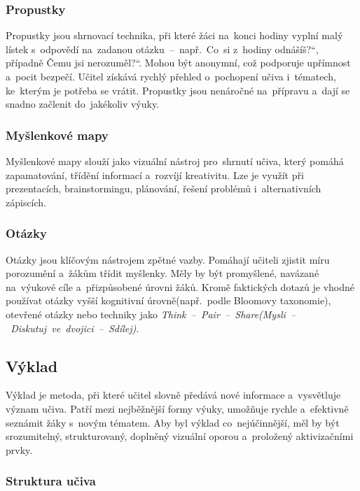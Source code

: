 \documentclass[male,czech,api_bc]{kitheses}
\begin{document}
\subsubsection{Propustky}

Propustky jsou shrnovací technika, při které žáci na~konci hodiny vyplní malý lístek s~odpovědí na~zadanou otázku~--~např.~\quotedblbase Co~si z~hodiny odnášíš?“, případně \quotedblbase Čemu jsi nerozuměl?“. Mohou být anonymní, což podporuje upřímnost a~pocit bezpečí. Učitel získává rychlý přehled o~pochopení učiva i~tématech, ke~kterým je potřeba se vrátit. Propustky jsou nenáročné na~přípravu a~dají se snadno začlenit do~jakékoliv výuky.\cite{eduPropustky}

\subsubsection{Myšlenkové mapy}

Myšlenkové mapy slouží jako vizuální nástroj pro~shrnutí učiva, který pomáhá zapamatování, třídění informací a~rozvíjí kreativitu. Lze je využít při prezentacích, brainstormingu, plánování, řešení problémů i~alternativních zápiscích.\cite{eduMyslenkoveMapy}

\subsubsection{Otázky}

Otázky jsou klíčovým nástrojem zpětné vazby. Pomáhají učiteli zjistit míru porozumění a~žákům třídit myšlenky. Měly by být promyšlené, navázané na~výukové cíle a~přizpůsobené úrovni žáků. Kromě faktických dotazů je vhodné používat otázky vyšší kognitivní úrovně\break(např.~podle Bloomovy taxonomie), otevřené otázky nebo techniky jako \textit{Think~--~Pair~--~Share\break(Mysli~--~Diskutuj~ve~dvojici~--~Sdílej)}.\cite{eduOtazky}

\subsection{Výklad}

Výklad je metoda, při které učitel slovně předává nové informace a~vysvětluje význam učiva. Patří mezi nejběžnější formy výuky, umožňuje rychle a~efektivně seznámit žáky s~novým tématem. Aby byl výklad co~nejúčinnější, měl by být srozumitelný, strukturovaný, doplněný vizuální oporou a~proložený aktivizačními prvky.\cite{eduVyklad}

\subsubsection{Struktura učiva}
\end{document}
